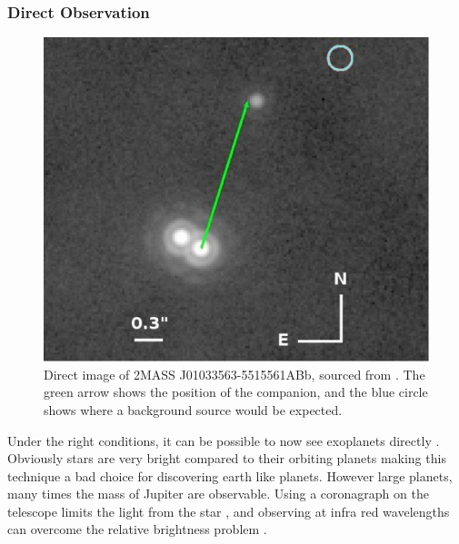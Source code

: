 \subsubsection{Direct Observation}

\begin{figure}[\here]
    \centering
    \includegraphics[width=\figwidth]{images/direct_image.png}
    \caption{Direct image of 2MASS J01033563-5515561ABb, sourced from \cite{delorme2013direct}. The green arrow shows the position of the companion, and the blue circle shows where a background source would be expected.}
    \label{fig:direct}
\end{figure}

Under the right conditions, it can be possible to now see exoplanets directly \citep{lafreniere2010directly,kuzuhara2013direct,delorme2013direct}. Obviously stars are very bright compared to their orbiting planets making this technique a bad choice for discovering earth like planets. However large planets, many times the mass of Jupiter are observable. Using a coronagraph on the telescope limits the light from the star \citep{kuchner2002coronagraph}, and observing at infra red wavelengths can overcome the relative brightness problem \citep{delorme2013direct}.
